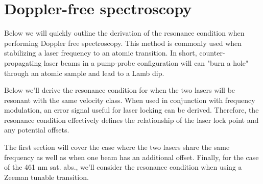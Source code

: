 \chapter{Doppler-free spectroscopy} \label{app:dopSpec}
Below we will quickly outline the derivation of the resonance condition when performing Doppler free spectroscopy.
This method is commonly used when stabilizing a laser frequency to an atomic transition.
In short, counter-propagating laser beams in a pump-probe configuration will can "burn a hole" through an atomic sample and lead to a Lamb dip.

Below we'll derive the resonance condition for when the two lasers will be resonant with the same velocity class.
When used in conjunction with frequency modulation, an error signal useful for laser locking can be derived.
Therefore, the resonance condition effectively defines the relationship of the laser lock point and any potential offsets.

The first section will cover the case where the two lasers share the same frequency as well as when one beam has an additional offset.
Finally, for the case of the 461 nm sat. abs., we'll consider the resonance condition when using a Zeeman tunable transition. 

